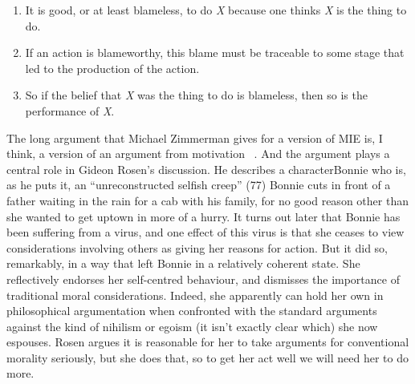 \begin{enumerate}
\item{} It is good, or at least blameless, to do \emph{X} because one thinks \emph{X} is the thing to do.

\item{} If an action is blameworthy, this blame must be traceable to some stage that led to the production of the action.

\item{} So if the belief that \emph{X} was the thing to do is blameless, then so is the performance of \emph{X}.

\end{enumerate}
The long argument that Michael Zimmerman gives for a version of MIE is, I think, a version of an argument from motivation ~\citep[175ff]{Zimmerman2008}. And the argument plays a central role in Gideon Rosen's discussion. He describes a character\gls{Bonnie} who is, as he puts it, an ``unreconstructed selfish creep'' (77) \gls{Bonnie} cuts in front of a father waiting in the rain for a cab with his family, for no good reason other than she wanted to get uptown in more of a hurry. It turns out later that \gls{Bonnie} has been suffering from a virus, and one effect of this virus is that she ceases to view considerations involving others as giving her reasons for action. But it did so, remarkably, in a way that left \gls{Bonnie} in a relatively coherent state. She reflectively endorses her self-centred behaviour, and dismisses the importance of traditional moral considerations. Indeed, she apparently can hold her own in philosophical argumentation when confronted with the standard arguments against the kind of nihilism or egoism (it isn't exactly clear which) she now espouses. Rosen argues it is reasonable for her to take arguments for conventional morality seriously, but she does that, so to get her act well we will need her to do more.

